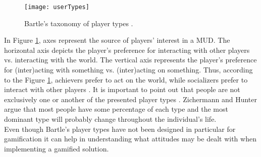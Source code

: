 \begin{figure}[h]
    \centering
    \texttt{[image: userTypes]}
    \caption{Bartle's taxonomy of player types \cite{bartle}.}
    \label{fig:userTypes}
\end{figure}
In Figure \ref{fig:userTypes}, axes represent the source of players' interest in a MUD. The horizontal axis depicts the player's preference for interacting with other players vs. interacting with the world. The vertical axis represents the player's preference for (inter)acting with something vs. (inter)acting on something. Thus, according to the Figure \ref{fig:userTypes}, achievers prefer to act on the world, while socializers prefer to interact with other players \cite{bartle}. It is important to point out that people are not exclusively one or another of the presented player types \cite{zichermann2011gamification}. Zichermann and Hunter \cite{zichermann2011gamification} argue that most people have some percentage of each type and the most dominant type will probably change throughout the individual's life.\\ Even though Bartle's player types have not been designed in particular for gamification it can help in understanding what attitudes may be dealt with when implementing a gamified solution. 
